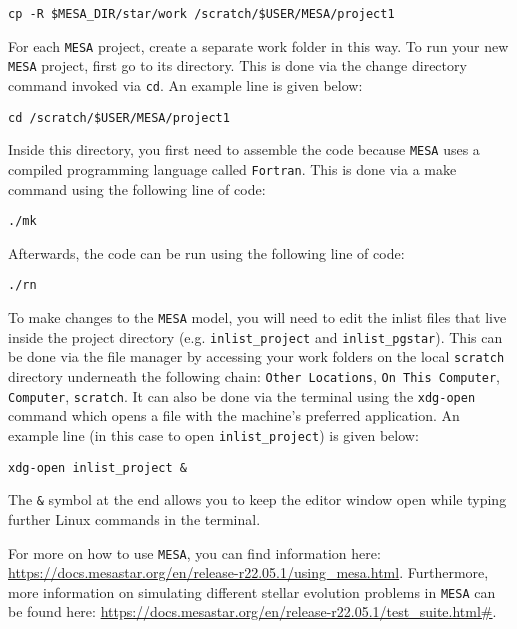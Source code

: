 \documentclass[11pt,a4paper]{article}
\begin{document}
\begin{lstlisting}
cp -R $MESA_DIR/star/work /scratch/$USER/MESA/project1
\end{lstlisting}

\noindent
For each \texttt{MESA} project, create a separate work folder in this way. To run your new \texttt{MESA} project, first go to its directory. This is done via the change directory command invoked via \texttt{cd}. An example line is given below:

\begin{lstlisting}
cd /scratch/$USER/MESA/project1
\end{lstlisting}

\noindent
Inside this directory, you first need to assemble the code because \texttt{MESA} uses a compiled programming language called \texttt{Fortran}. This is done via a make command using the following line of code: 

\begin{lstlisting}
./mk
\end{lstlisting}

\noindent
Afterwards, the code can be run using the following line of code: 

\begin{lstlisting}
./rn
\end{lstlisting}

\noindent
To make changes to the \texttt{MESA} model, you will need to edit the inlist files that live inside the project directory (e.g. \texttt{inlist\_project} and \texttt{inlist\_pgstar}). This can be done via the file manager by accessing your work folders on the local \texttt{scratch} directory underneath the following chain: \texttt{Other Locations}, \texttt{On This Computer}, \texttt{Computer}, \texttt{scratch}. It can also be done via the terminal using the \texttt{xdg-open} command which opens a file with the machine's preferred application. An example line (in this case to open \texttt{inlist\_project}) is given below:

\begin{lstlisting}
xdg-open inlist_project &
\end{lstlisting}

\noindent
The \texttt{\&} symbol at the end allows you to keep the editor window open while typing further Linux commands in the terminal.

\bigskip\noindent
For more on how to use \texttt{MESA}, you can find information here: \url{https://docs.mesastar.org/en/release-r22.05.1/using_mesa.html}. Furthermore, more information on simulating different stellar evolution problems in \texttt{MESA} can be found here: \url{https://docs.mesastar.org/en/release-r22.05.1/test_suite.html#}.
\end{document}
